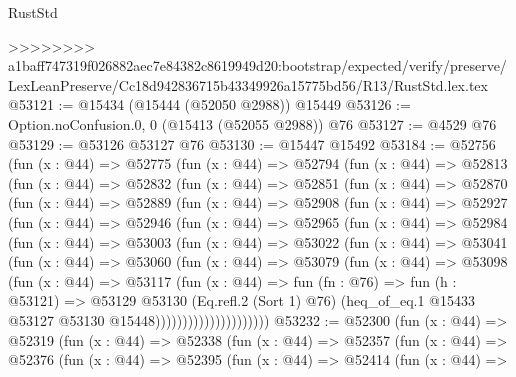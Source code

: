 \begin{lexlean}{RustStd}
\begin{coremodule}
{\begin{coremodule}
{{{{{{{{{{{{{{{{{{{{{{{{{{{{{{{{{{{{{{{{{{{{{{{{{{{{{{{{{{{{>>>>>>>> a1baff747319f026882aec7e84382c8619949d20:bootstrap/expected/verify/preserve/LexLeanPreserve/Cc18d942836715b43349926a15775bd56/R13/RustStd.lex.tex
@53121 := @15434 (@15444 (@52050 @2988)) @15449
@53126 := Option.noConfusion.{0, 0} (@15413 (@52055 @2988)) @76
@53127 := @4529 @76
@53129 := @53126 @53127 @76
@53130 := @15447 @15492
@53184 := @52756
    (fun (x : @44) =>
    @52775
      (fun (x : @44) =>
      @52794
        (fun (x : @44) =>
        @52813
          (fun (x : @44) =>
          @52832
            (fun (x : @44) =>
            @52851
              (fun (x : @44) =>
              @52870
                (fun (x : @44) =>
                @52889
                  (fun (x : @44) =>
                  @52908
                    (fun (x : @44) =>
                    @52927
                      (fun (x : @44) =>
                      @52946
                        (fun (x : @44) =>
                        @52965
                          (fun (x : @44) =>
                          @52984
                            (fun (x : @44) =>
                            @53003
                              (fun (x : @44) =>
                              @53022
                                (fun (x : @44) =>
                                @53041
                                  (fun (x : @44) =>
                                  @53060
                                    (fun (x : @44) =>
                                    @53079
                                      (fun (x : @44) =>
                                      @53098
                                        (fun (x : @44) =>
                                        @53117
                                          (fun (x : @44) =>
                                          fun (fn : @76) =>
                                          fun (h : @53121) =>
                                          @53129
                                            @53130
                                            (Eq.refl.{2} (Sort 1) @76)
                                            (heq_of_eq.{1}
                                              @15433
                                              @53127
                                              @53130
                                              @15448)))))))))))))))))))))
@53232 := @52300
    (fun (x : @44) =>
    @52319
      (fun (x : @44) =>
      @52338
        (fun (x : @44) =>
        @52357
          (fun (x : @44) =>
          @52376
            (fun (x : @44) =>
            @52395
              (fun (x : @44) =>
              @52414
                (fun (x : @44) =>
}}}}}}}}}}}}}}}}}}}}}}}}}}}}}}}}}}}}}}}}}}}}}}}}}}}}}}}}}}}}
\end{coremodule}}
\end{coremodule}
\end{lexlean}
